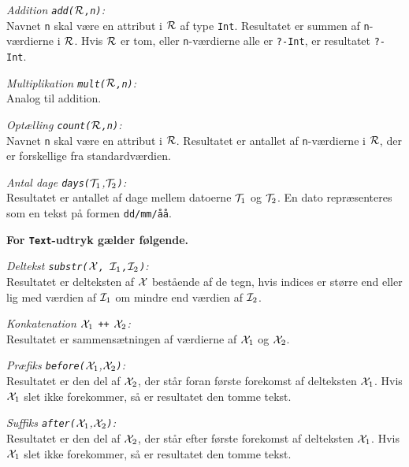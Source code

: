 {\em Addition \verb"add("$\cal R$\verb",n)":}\\
Navnet \verb"n" skal v\ae{}re en attribut i $\cal R$ af type \verb"Int".
Resultatet er summen af \verb"n"-v\ae{}rdierne i $\cal R$. Hvis 
$\cal R$ er tom, eller \verb"n"-v\ae{}rdierne alle er \verb"?-Int", er
resultatet \verb"?-Int".

{\em Multiplikation \verb"mult("$\cal R$\verb",n)":}\\
Analog til addition.

{\em Opt\ae{}lling \verb"count("$\cal R$\verb",n)":}\\
Navnet \verb"n" skal v\ae{}re en attribut i $\cal R$.
Resultatet er antallet af \verb"n"-v\ae{}rdierne i $\cal R$, der er
forskellige fra standardv\ae{}rdien.

{\em Antal dage \verb"days("${\cal T}_1$,${\cal T}_2$\verb")":}\\
Resultatet er antallet af dage mellem datoerne ${\cal T}_1$ og ${\cal T}_2$.
En dato repr\ae{}senteres som en tekst p\aa{} formen {\tt dd/mm/\aa{}\aa{}}.

{\bf For \verb"Text"-udtryk g\ae{}lder f\o{}lgende.}

{\em Deltekst \verb"substr("$\cal X$\verb", "${\cal I}_1$\verb","${\cal I}_2$\verb")":}\\
Resultatet er delteksten af $\cal X$ best\aa{}ende af de tegn, hvis
indices er st\o{}rre end eller lig med v\ae{}rdien af 
${\cal I}_1$ om mindre end v\ae{}rdien af ${\cal I}_2$.

{\em Konkatenation ${\cal X}_1$ \verb"++" ${\cal X}_2$:}\\
Resultatet er sammens\ae{}tningen af v\ae{}rdierne af
${\cal X}_1$ og ${\cal X}_2$.

{\em Pr\ae{}fiks \verb"before("${\cal X}_1$,${\cal X}_2$\verb")":}\\
Resultatet er den del af ${\cal X}_2$, der st\aa{}r foran f\o{}rste forekomst af
delteksten ${\cal X}_1$. Hvis ${\cal X}_1$ slet ikke forekommer, s\aa{} er
resultatet den tomme tekst.

{\em Suffiks \verb"after("${\cal X}_1$,${\cal X}_2$\verb")":}\\
Resultatet er den del af ${\cal X}_2$, der st\aa{}r efter f\o{}rste forekomst af
delteksten ${\cal X}_1$. Hvis ${\cal X}_1$ slet ikke forekommer, s\aa{} er
resultatet den tomme tekst.

